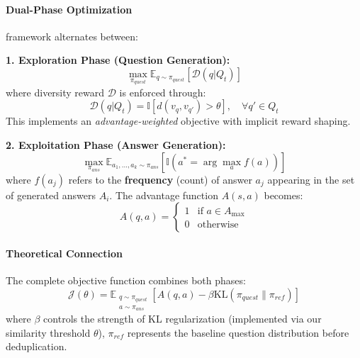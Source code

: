 

\paragraph{Dual-Phase Optimization}  
{\langname} framework alternates between:  

\textbf{1. Exploration Phase (Question Generation):}  
$$\max_{\pi_{quest}} \mathbb{E}_{q \sim \pi_{quest}}[\mathcal{D}(q|Q_t)]$$  
where diversity reward \(\mathcal{D}\) is enforced through:  
$$\mathcal{D}(q|Q_t) = \mathbb{I}[d(v_q, v_{q'}) > \theta], \quad \forall q' \in Q_t$$  
This implements an \textit{advantage-weighted} objective with implicit reward shaping.  



\textbf{2. Exploitation Phase (Answer Generation):}  
$$\max_{\pi_{ans}} \mathbb{E}_{a_1,...,a_k \sim \pi_{ans}}[\mathbb{I}(a^* = \arg\max_{a} f(a))]$$  
where \( f(a_j) \) refers to the \textbf{frequency} (count) of answer \( a_j \) appearing in the set of generated answers \( A_i \). The advantage function \(A(s,a)\) becomes:  
$$A(q,a) = \begin{cases} 
1 & \text{if } a \in A_{\text{max}} \\
0 & \text{otherwise}
\end{cases}$$  

\paragraph{Theoretical Connection}  
The complete objective function combines both phases:  
$$\mathcal{J}(\theta) = \mathbb{E}_{\substack{q \sim \pi_{quest} \\ a \sim \pi_{ans}}}[A(q,a) - \beta \text{KL}(\pi_{quest} \| \pi_{ref})]$$  
where \(\beta\) controls the strength of KL regularization (implemented via our similarity threshold \(\theta\)), \(\pi_{ref}\) represents the baseline question distribution before deduplication.

